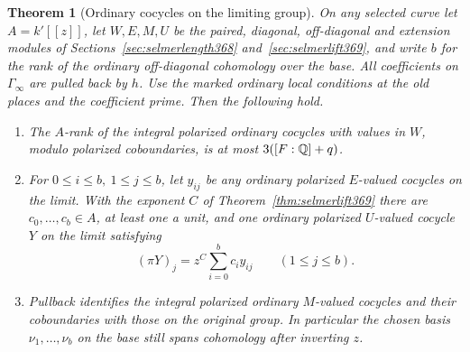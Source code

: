\documentclass[a4paper,11pt]{article}
\newtheorem{theorem}[proposition]{Theorem}
\theoremstyle{definition}
\theoremstyle{remark}
\numberwithin{equation}{section}
\begin{document}
\begin{theorem}[Ordinary cocycles on the limiting group]\leavevmode
\label{thm:limitselmer407}
On any selected curve let \(A=k'[[z]]\), let \(W,E,M,U\)
be the paired, diagonal, off-diagonal and extension modules
of Sections~\ref{sec:selmerlength368}
and~\ref{sec:selmerlift369}, and write \(b\) for the
rank of the ordinary off-diagonal cohomology over the base.
All coefficients on \(\Gamma_\infty\) are pulled back by \(h\).
Use the marked ordinary local conditions at the old places
and the coefficient prime. Then the following hold.
\begin{enumerate}
\item The \(A\)-rank of the integral polarized ordinary cocycles
with values in \(W\), modulo polarized coboundaries, is at most
\(3([F:\mathbb Q]+q)\).
\item For \(0\le i\le b,\ 1\le j\le b\), let \(y_{ij}\)
be any ordinary polarized \(E\)-valued cocycles on the limit.
With the exponent \(C\) of Theorem~\ref{thm:selmerlift369}
there are \(c_0,\ldots,c_b\in A\), at least one a unit, and
one ordinary polarized \(U\)-valued cocycle \(Y\) on the limit
satisfying
\[
                     (\pi Y)_j=z^C\sum_{i=0}^{b}c_i y_{ij}
                                      \qquad(1\le j\le b).
\]
\item Pullback identifies the integral polarized ordinary
\(M\)-valued cocycles and their coboundaries with those on
the original group. In particular the chosen basis
\(\nu_1,\ldots,\nu_b\) on the base still spans cohomology
after inverting \(z\).
\end{enumerate}
\end{theorem}
\end{document}
